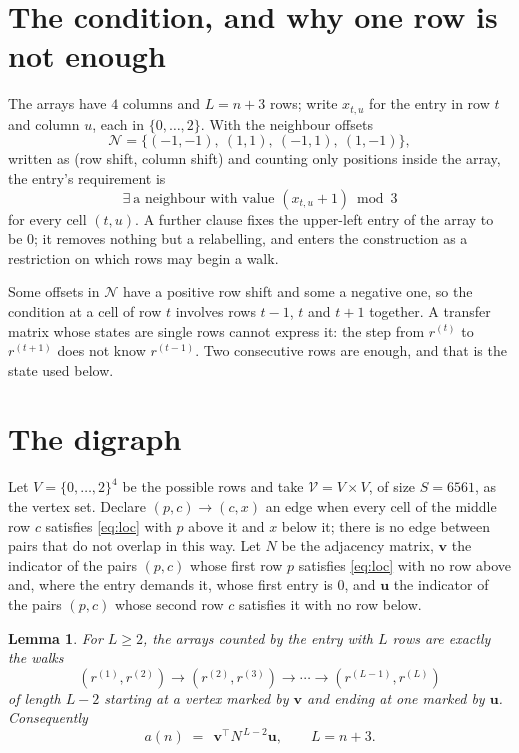 \documentclass[11pt,a4paper]{article}
\theoremstyle{plain}
\newtheorem{lemma}[theorem]{Lemma}
\theoremstyle{definition}
\begin{document}
\section{The condition, and why one row is not enough}

The arrays have $4$ columns and $L=n+3$ rows; write $x_{t,u}$ for the entry in
row $t$ and column $u$, each in $\{0,\dots,2\}$. With the neighbour offsets
\[
\mathcal N=\{(-1,-1),\ (1,1),\ (-1,1),\ (1,-1)\},
\]
written as (row shift, column shift) and counting only positions inside the array, the
entry's requirement is
\begin{equation}\label{eq:loc}
\exists\ \text{a neighbour with value }(x_{t,u}+1)\bmod 3
\end{equation}
for every cell $(t,u)$. A further clause fixes the upper-left entry of the array to be $0$; it removes nothing but a relabelling, and enters the construction as a restriction on which rows may begin a walk.

Some offsets in $\mathcal N$ have a positive row shift and some a negative one, so the
condition at a cell of row $t$ involves rows $t-1$, $t$ and $t+1$ together. A transfer
matrix whose states are single rows cannot express it: the step from $r^{(t)}$ to
$r^{(t+1)}$ does not know $r^{(t-1)}$. Two consecutive rows are enough, and that is
the state used below.

\section{The digraph}

Let $V=\{0,\dots,2\}^{4}$ be the possible rows and take
$\mathcal V=V\times V$, of size $S=6561$, as the vertex set. Declare $(p,c)\to(c,x)$ an edge
when every cell of the middle row $c$ satisfies \eqref{eq:loc} with $p$ above it and $x$
below it; there is no edge between pairs that do not overlap in this way. Let $N$ be the
adjacency matrix, $\mathbf{v}$ the indicator of the pairs $(p,c)$ whose first row $p$
satisfies \eqref{eq:loc} with no row above and, where the entry demands it, whose first entry is $0$, and $\mathbf{u}$ the indicator of
the pairs $(p,c)$ whose second row $c$ satisfies it with no row below.

\begin{lemma}\label{lem:walk}
For $L\ge2$, the arrays counted by the entry with $L$ rows are exactly the walks
\[
(r^{(1)},r^{(2)})\to(r^{(2)},r^{(3)})\to\cdots\to(r^{(L-1)},r^{(L)})
\]
of length $L-2$ starting at a vertex marked by $\mathbf{v}$ and ending at one marked by
$\mathbf{u}$. Consequently
\[
a(n)\;=\;\,\mathbf{v}^{\!\top}N^{\,L-2}\mathbf{u},\qquad L=n+3 .
\]
\end{lemma}
\end{document}
